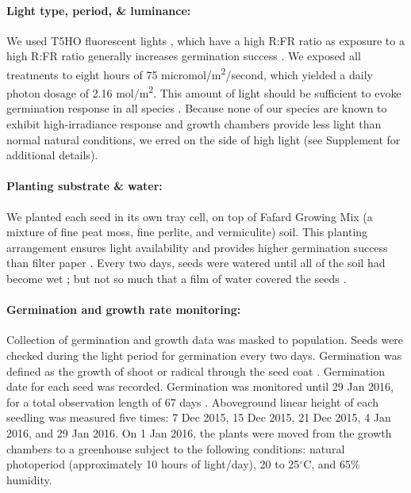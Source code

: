 \documentclass[11pt]{article}\usepackage[]{graphicx}\usepackage[]{color}
\begin{document}
	\paragraph{Light type, period, \& luminance:} We used T5HO fluorescent lights \parencite{Toole1963}, which have a high R:FR ratio as exposure to a high R:FR ratio generally increases germination success \parencite[though some studies find germination requires high R:FR ratio or is insensitive,][]{Popay1970,Pons2000,Wulff1994}. %
We exposed all treatments to eight hours \parencite[coinciding with the higher temperature,][]{Baskin1998} of 75 micromol/m\textsuperscript{2}/second, which yielded a daily photon dosage of 2.16 mol/m\textsuperscript{2}. This amount of light should be sufficient to evoke germination response in all species \parencite{Pons1991}. Because none of our species are known to exhibit high-irradiance response and growth chambers provide less light than normal natural conditions, we erred on the side of high light (see Supplement for additional details). 
	
	\paragraph{Planting substrate \& water:} We planted each seed in its own tray cell, on top of Fafard Growing Mix (a mixture of fine peat moss, fine perlite, and vermiculite) soil. This planting arrangement ensures light availability \parencite{Tester1987} and provides higher germination success than filter paper \parencite{Andrews1974}. Every two days, seeds were watered until all of the soil had become wet \parencite{Steinbauer1957}; but not so much that a film of water covered the seeds \parencite{AOSA1960}.
	
	\paragraph{Germination and growth rate monitoring:} Collection of germination and growth data was masked to population. Seeds were checked during the light period for germination every two days. Germination was defined as the growth of shoot or radical through the seed coat \parencite{Baskin1998,Popay1970}. Germination date for each seed was recorded. Germination was monitored until 29 Jan 2016, for a total observation length of 67 days \parencite[this is longer than the typical two-week germination trials according to][]{Baskin1998,Wulff1994}. Aboveground linear height of each seedling was measured five times: 7 Dec 2015, 15 Dec 2015, 21 Dec 2015, 4 Jan 2016, and 29 Jan 2016. On 1 Jan 2016, the plants were moved from the growth chambers to a greenhouse subject to the following conditions: natural photoperiod (approximately 10 hours of light/day), 20 to 25$^\circ$C, and 65\% humidity.
\end{document}
